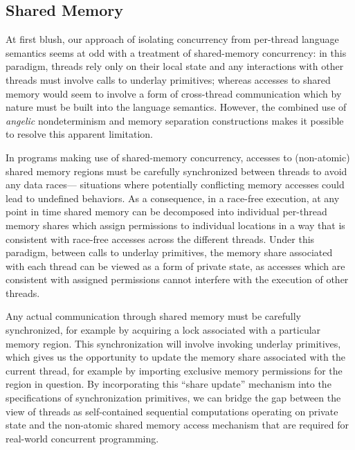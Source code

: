 \subsection{Shared Memory}

At first blush,
our approach of isolating concurrency
from per-thread language semantics
seems at odd with a treatment of shared-memory concurrency:
in this paradigm,
threads rely only on their local state and
any interactions with other threads
must involve calls to underlay primitives;
whereas accesses to shared memory
would seem to involve a form of cross-thread communication
which by nature must be built into the language semantics.
However,
the combined use of \emph{angelic} nondeterminism
and memory separation constructions
makes it possible to resolve this apparent limitation.

In programs making use of shared-memory concurrency,
accesses to (non-atomic) shared memory regions
must be carefully synchronized between threads to avoid any data races---%
situations where potentially conflicting memory accesses
could lead to undefined behaviors.
As a consequence,
in a race-free execution,
at any point in time shared memory can be decomposed
into individual per-thread memory shares
which assign permissions to individual locations
in a way that is consistent with race-free accesses
across the different threads.
Under this paradigm,
between calls to underlay primitives,
the memory share associated with each thread
can be viewed as a form of private state,
as accesses which are consistent with assigned permissions
cannot interfere with the execution of other threads.

Any actual communication through shared memory
must be carefully synchronized,
for example by acquiring a lock associated with
a particular memory region.
This synchronization will involve
invoking underlay primitives,
which gives us the opportunity to update
the memory share associated with the current thread,
for example by importing exclusive memory permissions
for the region in question.
By incorporating this ``share update'' mechanism
into the specifications of synchronization primitives,
we can bridge the gap between the view of threads as
self-contained sequential computations operating on private state and
the non-atomic shared memory access mechanism
that are required for real-world concurrent programming.

